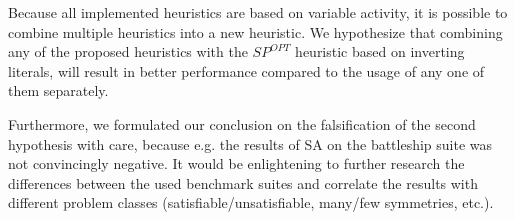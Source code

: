 
Because all implemented heuristics are based on variable activity, it is possible to combine
multiple heuristics into a new heuristic.
We hypothesize that combining any of the proposed heuristics with the $SP^{OPT}$ heuristic based on
inverting literals, will result in better performance compared to the usage of any one of them
separately.

Furthermore, we formulated our conclusion on the falsification of the second hypothesis with care,
because e.g. the results of SA on the battleship suite was not convincingly negative.
It would be enlightening to further research the differences between the used benchmark suites and
correlate the results with different problem classes (satisfiable/unsatisfiable, many/few
symmetries, etc.).
